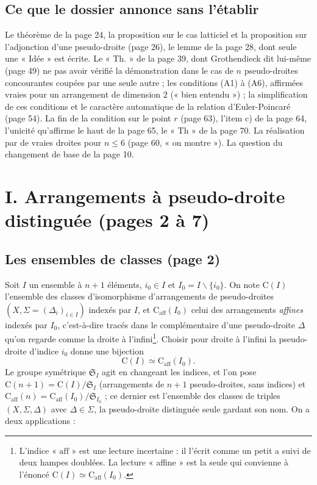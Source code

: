\documentclass[11pt,a4paper]{article}
\begin{document}
\subsection*{Ce que le dossier annonce sans l'établir}

Le théorème de la page 24, la proposition sur le cas latticiel et la
proposition sur l'adjonction d'une pseudo-droite (page 26), le lemme de la
page 28, dont seule une « Idée » est écrite. Le « Th. » de la page 39, dont
Grothendieck dit lui-même (page 49) ne pas avoir vérifié la démonstration
dans le cas de $n$ pseudo-droites concourantes coupées par une seule autre ;
les conditions (A1) à (A6), affirmées vraies pour un arrangement de
dimension $2$ (« bien entendu ») ; la simplification de ces conditions et le
caractère automatique de la relation d'Euler-Poincaré (page 54). La fin de
la condition sur le point $r$ (page 63), l'item c) de la page 64,
l'unicité qu'affirme le haut de la page 65, le « Th » de la page 70. La
réalisation par de vraies droites pour $n \leqslant 6$ (page 60, « on
montre »). La question du changement de base de la page 10.

\section*{I. Arrangements à pseudo-droite distinguée (pages 2 à 7)}

\subsection*{Les ensembles de classes (page 2)}

Soit $I$ un ensemble à $n+1$ éléments, $i_0 \in I$ et $I_0 = I \smallsetminus
\{i_0\}$. On note $\mathrm{C}(I)$ l'ensemble des classes d'isomorphisme
d'arrangements de pseudo-droites $(X, \Sigma = (\Delta_i)_{i \in I})$ indexés
par $I$, et $\mathrm{C}_{\mathrm{aff}}(I_0)$ celui des arrangements
\emph{affines} indexés par $I_0$, c'est-à-dire tracés dans le complémentaire
d'une pseudo-droite $\Delta$ qu'on regarde comme la droite à
l'infini\footnote{L'indice « $\mathrm{aff}$ » est une lecture incertaine :
il l'écrit comme un petit a suivi de deux hampes doublées. La lecture
« affine » est la seule qui convienne à l'énoncé
$\mathrm{C}(I) \simeq \mathrm{C}_{\mathrm{aff}}(I_0)$.}. Choisir pour droite
à l'infini la pseudo-droite d'indice $i_0$ donne une bijection
\[
\mathrm{C}(I) \simeq \mathrm{C}_{\mathrm{aff}}(I_0).
\]
Le groupe symétrique $\mathfrak{S}_I$ agit en changeant les indices, et l'on
pose $\mathrm{C}(n+1) = \mathrm{C}(I)/\mathfrak{S}_I$ (arrangements de $n+1$
pseudo-droites, sans indices) et $\mathrm{C}_{\mathrm{aff}}(n) =
\mathrm{C}_{\mathrm{aff}}(I_0)/\mathfrak{S}_{I_0}$ ; ce dernier est
l'ensemble des classes de triples $(X, \Sigma, \Delta)$ avec $\Delta \in
\Sigma$, la pseudo-droite distinguée seule gardant son nom. On a deux
applications :
\end{document}
